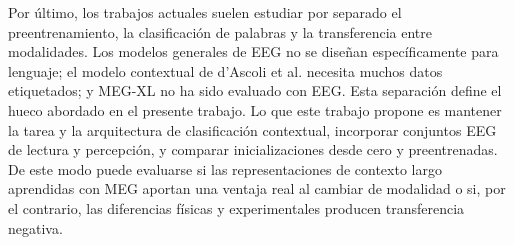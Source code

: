 Por último, los trabajos actuales suelen estudiar por separado el preentrenamiento, la clasificación de palabras y la transferencia entre modalidades. Los modelos generales de EEG no se diseñan específicamente para lenguaje; el modelo contextual de d'Ascoli et al. necesita muchos datos etiquetados; y MEG-XL no ha sido evaluado con EEG. Esta separación define el hueco abordado en el presente trabajo. Lo que este trabajo propone es mantener la tarea y la arquitectura de clasificación contextual, incorporar conjuntos EEG de lectura y percepción, y comparar inicializaciones desde cero y preentrenadas. De este modo puede evaluarse si las representaciones de contexto largo aprendidas con MEG aportan una ventaja real al cambiar de modalidad o si, por el contrario, las diferencias físicas y experimentales producen transferencia negativa.
